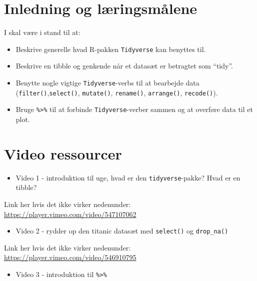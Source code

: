 \documentclass[
]{book}
\providecommand{\tightlist}{%
  \setlength{\itemsep}{0pt}\setlength{\parskip}{0pt}}
\begin{document}
\hypertarget{inledning-og-luxe6ringsmuxe5lene}{%
\section{Inledning og læringsmålene}\label{inledning-og-luxe6ringsmuxe5lene}}

I skal være i stand til at:

\begin{itemize}
\tightlist
\item
  Beskrive generelle hvad R-pakken \texttt{Tidyverse} kan benyttes til.
\item
  Beskrive en tibble og genkende når et datasæt er betragtet som ``tidy''.
\item
  Benytte nogle vigtige \texttt{Tidyverse}-verbs til at bearbejde data (\texttt{filter()},\texttt{select()}, \texttt{mutate()}, \texttt{rename()}, \texttt{arrange()}, \texttt{recode()}).
\item
  Bruge \texttt{\%\textgreater{}\%} til at forbinde \texttt{Tidyverse}-verber sammen og at overføre data til et plot.
\end{itemize}

\hypertarget{video-ressourcer-2}{%
\section{Video ressourcer}\label{video-ressourcer-2}}

\begin{itemize}
\tightlist
\item
  Video 1 - introduktion til uge, hvad er den \texttt{tidyverse}-pakke? Hvad er en tibble?
\end{itemize}

Link her hvis det ikke virker nedenunder: \url{https://player.vimeo.com/video/547107062}

\begin{itemize}
\tightlist
\item
  Video 2 - rydder op den titanic datasæt med \texttt{select()} og \texttt{drop\_na()}
\end{itemize}

Link her hvis det ikke virker nedenunder: \url{https://player.vimeo.com/video/546910795}

\begin{itemize}
\tightlist
\item
  Video 3 - introduktion til \texttt{\%\textgreater{}\%}
\end{itemize}
\end{document}
